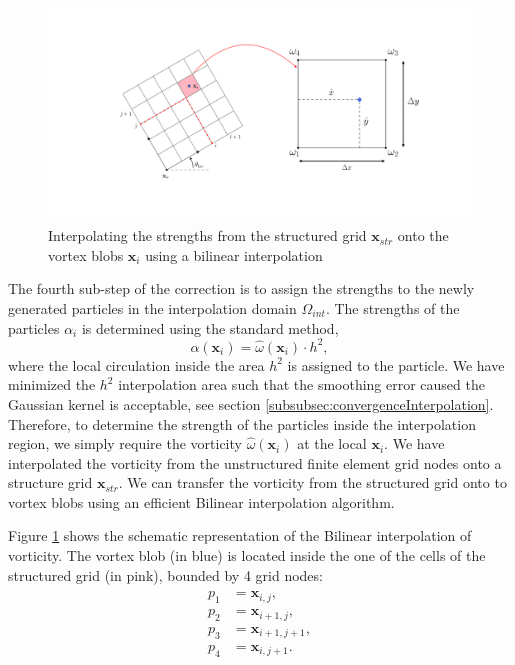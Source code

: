 	\begin{figure}[!b]
	\centering
	\includegraphics[trim=5.5cm 3.cm 4.5cm 3cm, clip, width=0.99\linewidth]{./figures/hybrid/interpolation/ellipse/interpolationManual.pdf}
	\caption{Interpolating the strengths from the structured grid $\mathbf{x}_{str}$ onto the vortex blobs $\mathbf{x}_i$ using a bilinear interpolation}
	\label{fig:interpolationManual}
	\end{figure}


The fourth sub-step of the correction is to assign the strengths to the newly generated particles in the interpolation domain $\Omega_{int}$. The strengths of the particles $\alpha_i$ is determined using the standard method,
\begin{equation}
\alpha(\mathbf{x}_i) = \hat{\omega}(\mathbf{x}_i) \cdot h^2,
\end{equation}
where the local circulation inside the area $h^2$ is assigned to the particle. We have minimized the $h^2$ interpolation area such that the smoothing error caused the Gaussian kernel is acceptable, see section \ref{subsubsec:convergenceInterpolation}. Therefore, to determine the strength of the particles inside the interpolation region, we simply require the vorticity $\hat{\omega}(\mathbf{x}_i)$ at the local $\mathbf{x}_i$. We have interpolated the vorticity from the unstructured finite element grid nodes onto a structure grid $\mathbf{x}_{str}$. We can transfer the vorticity from the structured grid onto to vortex blobs using an efficient Bilinear interpolation algorithm.



Figure \ref{fig:interpolationManual} shows the schematic representation of the Bilinear interpolation of vorticity. The vortex blob (in blue) is located inside the one of the cells of the structured grid (in pink), bounded by 4 grid nodes:
\begin{eqnarray}
\begin{aligned}
p_1 &= \mathbf{x}_{i,j},\\
p_2 &= \mathbf{x}_{i+1,j},\\
p_3 &= \mathbf{x}_{i+1,j+1},\\
p_4 &= \mathbf{x}_{i,j+1}.
\end{aligned}
\end{eqnarray}

